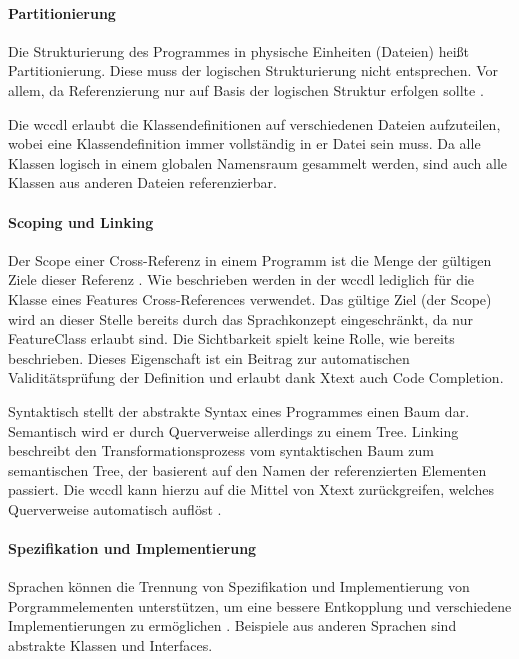     \paragraph{Partitionierung}
    Die Strukturierung des Programmes in physische Einheiten (Dateien)
    heißt Partitionierung.
    Diese muss der logischen Strukturierung nicht entsprechen.
    Vor allem, da Referenzierung nur auf Basis der logischen Struktur erfolgen sollte
    \cite[Kapitel 5.1.2]{voelter:DslEngineering}.

    Die \gls{wccdl} erlaubt die Klassendefinitionen auf verschiedenen Dateien
    aufzuteilen, wobei eine Klassendefinition immer vollständig in er Datei sein muss.
    Da alle Klassen logisch in einem globalen Namensraum gesammelt werden,
    sind auch alle Klassen aus anderen Dateien referenzierbar.

    \paragraph{Scoping und Linking}
    Der Scope einer Cross-Referenz in einem Programm ist die Menge der
    gültigen Ziele dieser Referenz
    \cite[Kapitel 8]{voelter:DslEngineering}.
    Wie beschrieben werden in der \gls{wccdl} lediglich für die Klasse
    eines Features Cross-References verwendet.
    Das gültige Ziel (der Scope) wird an dieser Stelle bereits durch das Sprachkonzept
    eingeschränkt, da nur FeatureClass erlaubt sind.
    Die Sichtbarkeit spielt keine Rolle, wie bereits beschrieben.
    Dieses Eigenschaft ist ein Beitrag zur automatischen Validitätsprüfung der Definition
    und erlaubt dank Xtext auch Code Completion.

    Syntaktisch stellt der abstrakte Syntax eines Programmes einen Baum dar.
    Semantisch wird er durch Querverweise allerdings zu einem Tree.
    Linking beschreibt den Transformationsprozess vom syntaktischen Baum zum
    semantischen Tree, der basierent auf den Namen der referenzierten Elementen passiert.
    Die \gls{wccdl} kann hierzu auf die Mittel von Xtext zurückgreifen,
    welches Querverweise automatisch auflöst
    \cite[Kapitel 8]{voelter:DslEngineering}. %

    \paragraph{Spezifikation und Implementierung}
    Sprachen können die Trennung von Spezifikation und Implementierung von
    Porgrammelementen unterstützen, um eine bessere Entkopplung und verschiedene
    Implementierungen zu ermöglichen \cite[Kapitel 5.1.3]{voelter:DslEngineering}.
    Beispiele aus anderen Sprachen sind abstrakte Klassen und Interfaces.

